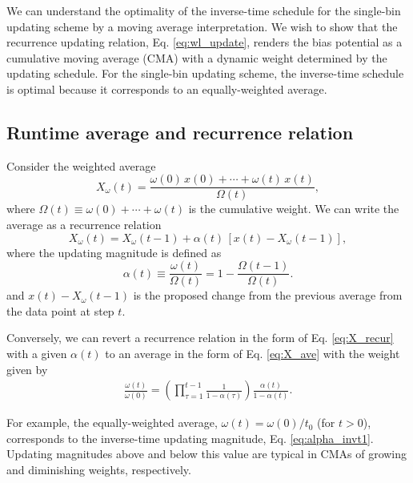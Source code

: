 \documentclass[reprint, superscriptaddress, floatfix]{revtex4-1}
\begin{document}
We can understand
the optimality of the inverse-time schedule
for the single-bin updating scheme
by a moving average interpretation.
%
We wish to show that the recurrence updating relation,
Eq. \eqref{eq:wl_update},
renders the bias potential
as a cumulative moving average (CMA) with a dynamic weight
determined by the updating schedule.
%
For the single-bin updating scheme,
the inverse-time schedule is optimal
because it corresponds to an equally-weighted average.


\subsection{Runtime average and recurrence relation}

Consider the weighted average
%
\begin{equation}
  X_\omega(t)
  =
  \frac{
    \omega(0) \, x(0) + \cdots + \omega(t) \, x(t)
  }
  {
    \Omega(t)
  }
  ,
  \label{eq:X_ave}
\end{equation}
%
where
$\Omega(t) \equiv \omega(0) + \cdots + \omega(t)$
is the cumulative weight.
%
We can write the average as a recurrence relation
%
\begin{equation}
  X_\omega(t)
  = X_\omega(t-1)
  +
  \alpha(t)
  \, [ x(t) - X_\omega(t-1) ]
  ,
  \label{eq:X_recur}
\end{equation}
%
where the updating magnitude is defined as
%
\begin{equation}
  \alpha(t) \equiv
  \frac{ \omega(t) } {\Omega(t)}
  =
  1 - \frac{ \Omega(t-1) } {\Omega(t)}
  .
  \label{eq:alpha_from_Omega}
\end{equation}
%
and $x(t) - X_\omega(t-1)$
is the proposed change from the previous average
from the data point at step $t$.

Conversely, we can revert a recurrence relation
in the form of Eq. \eqref{eq:X_recur}
with a given $\alpha(t)$
to an average in the form of Eq. \eqref{eq:X_ave}
with the weight given by
\begin{align}
  \frac{ \omega(t) } { \omega(0) }
  =
  \left(
    \prod_{\tau=1}^{t-1} \frac{1}{1- \alpha(\tau)}
  \right)
  \frac{ \alpha(t) } { 1 - \alpha(t) }
  .
  \label{eq:omega_from_alpha}
\end{align}

For example,
the equally-weighted average, $\omega(t) = \omega(0)/t_0$ (for $t > 0$),
corresponds to the inverse-time updating magnitude,
Eq. \eqref{eq:alpha_invt1}.
%
Updating magnitudes above and below this value
are typical in CMAs of
growing and diminishing weights, respectively.
\end{document}
